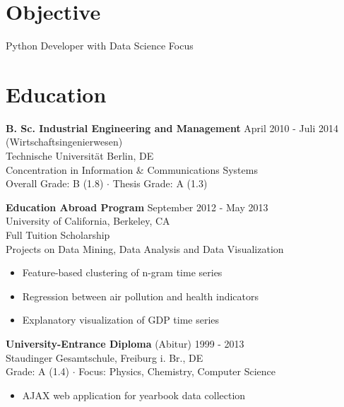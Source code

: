 \documentclass[margin]{res}
\begin{document}
 
 
 
\address{ \\ Rollbergstr. 1 \\ 12053 Berlin, DE  \\ $\star$21.06.1989
        }
\address{ \\ +49 175 768 49 37 \\ alec@hanefeld.eu \\ github.com/ahane \\}

 
\begin{resume} 
 
\section{Objective} 
Python Developer with Data Science Focus

\section{Education} 
{\bf B. Sc. Industrial Engineering and Management} \hfill April 2010 - Juli 2014 \\
(Wirtschaftsingenierwesen) \\
Technische Universit{\"a}t Berlin, DE \\
Concentration in Information \& Communications Systems\\
Overall Grade: B (1.8) $\cdot$ Thesis Grade: A (1.3)

{\bf Education Abroad Program} \hfill September 2012 - May 2013 \\
University of California, Berkeley, CA \\
Full Tuition Scholarship\\
Projects on Data Mining, Data Analysis and Data Visualization
\begin{itemize} \itemsep -2pt  %
\item Feature-based clustering of n-gram time series
\item Regression between air pollution and health indicators
\item Explanatory visualization of GDP time series
 \end{itemize}

{\bf University-Entrance Diploma} (Abitur)
\hfill 1999 - 2013 \\
Staudinger Gesamtschule, Freiburg i. Br., DE \\
Grade: A (1.4) $\cdot$ Focus: Physics, Chemistry, Computer Science
\begin{itemize} \itemsep -2pt  %
\item AJAX web application for yearbook data collection
\end{itemize}



\end{resume}
\end{document}

